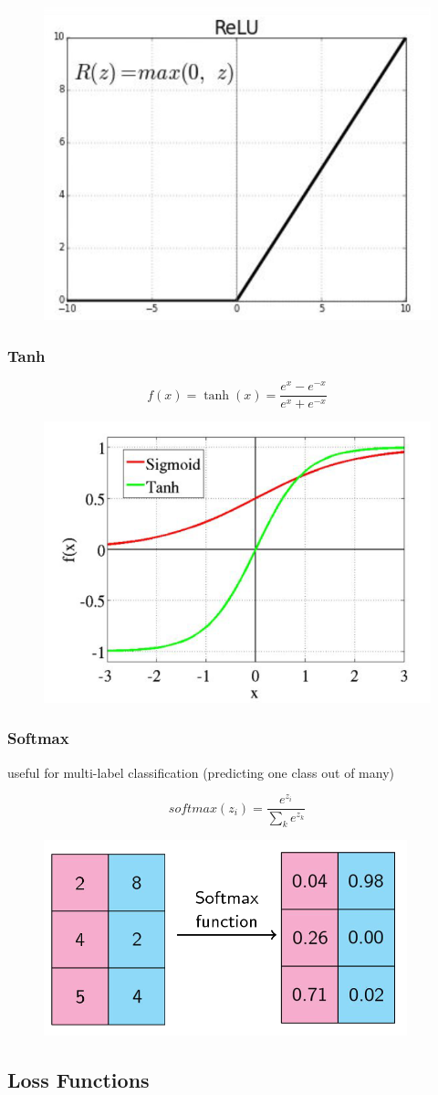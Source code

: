 \documentclass[11pt]{article}
\begin{document}
\begin{figure}[H]
    \centering
    \includegraphics*[width=.3\linewidth]{images/relu.png}
\end{figure}

\subsubsection{Tanh}

\begin{equation}
    f(x)=\tanh(x)=\frac{e^x - e^{-x}}{e^x + e^{-x}}
\end{equation}

\begin{figure}[H]
    \centering
    \includegraphics*[width=.3\linewidth]{images/tanh.png}
\end{figure}

\subsubsection{Softmax}

useful for multi-label classification (predicting one class out of many)

\begin{equation}
    softmax(z_i) = \frac{e^{z_i}}{\sum_k e^{z_k}}
\end{equation}

\begin{figure}[H]
    \centering
    \includegraphics*[width=.3\linewidth]{images/softmax.png}
\end{figure}

\subsection{Loss Functions}
\end{document}
